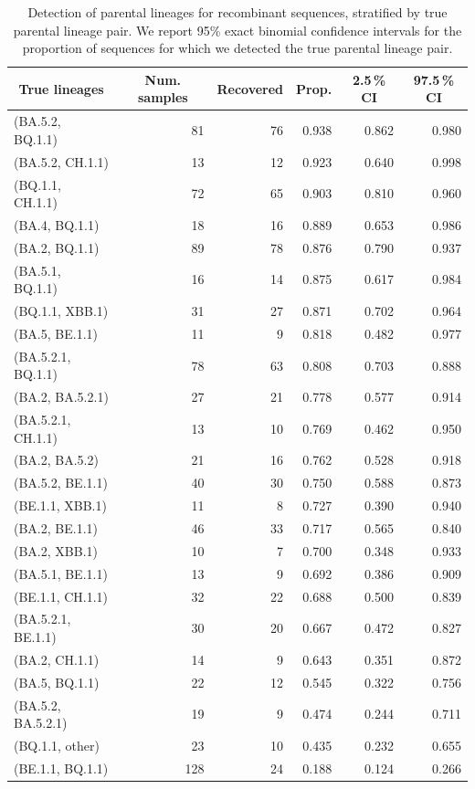 \documentclass[11pt,oneside,letterpaper]{article}
\begin{document}
\begin{table}[H]
\centering
\footnotesize
\begin{tabular}{@{}lrrrrr@{}}
\toprule
\multicolumn{1}{c}{True lineages} & \multicolumn{1}{c}{Num. samples} & \multicolumn{1}{c}{Recovered} & \multicolumn{1}{c}{Prop.} & \multicolumn{1}{c}{2.5\,\% CI} & \multicolumn{1}{c}{97.5\,\% CI} \\
\midrule
(BA.5.2, BQ.1.1) & 81 & 76 & 0.938 & 0.862 & 0.980 \\
(BA.5.2, CH.1.1) & 13 & 12 & 0.923 & 0.640 & 0.998 \\
(BQ.1.1, CH.1.1) & 72 & 65 & 0.903 & 0.810 & 0.960 \\
(BA.4, BQ.1.1) & 18 & 16 & 0.889 & 0.653 & 0.986 \\
(BA.2, BQ.1.1) & 89 & 78 & 0.876 & 0.790 & 0.937 \\
(BA.5.1, BQ.1.1) & 16 & 14 & 0.875 & 0.617 & 0.984 \\
(BQ.1.1, XBB.1) & 31 & 27 & 0.871 & 0.702 & 0.964 \\
(BA.5, BE.1.1) & 11 & 9 & 0.818 & 0.482 & 0.977 \\
(BA.5.2.1, BQ.1.1) & 78 & 63 & 0.808 & 0.703 & 0.888 \\
(BA.2, BA.5.2.1) & 27 & 21 & 0.778 & 0.577 & 0.914 \\
(BA.5.2.1, CH.1.1) & 13 & 10 & 0.769 & 0.462 & 0.950 \\
(BA.2, BA.5.2) & 21 & 16 & 0.762 & 0.528 & 0.918 \\
(BA.5.2, BE.1.1) & 40 & 30 & 0.750 & 0.588 & 0.873 \\
(BE.1.1, XBB.1) & 11 & 8 & 0.727 & 0.390 & 0.940 \\
(BA.2, BE.1.1) & 46 & 33 & 0.717 & 0.565 & 0.840 \\
(BA.2, XBB.1) & 10 & 7 & 0.700 & 0.348 & 0.933 \\
(BA.5.1, BE.1.1) & 13 & 9 & 0.692 & 0.386 & 0.909 \\
(BE.1.1, CH.1.1) & 32 & 22 & 0.688 & 0.500 & 0.839 \\
(BA.5.2.1, BE.1.1) & 30 & 20 & 0.667 & 0.472 & 0.827 \\
(BA.2, CH.1.1) & 14 & 9 & 0.643 & 0.351 & 0.872 \\
(BA.5, BQ.1.1) & 22 & 12 & 0.545 & 0.322 & 0.756 \\
(BA.5.2, BA.5.2.1) & 19 & 9 & 0.474 & 0.244 & 0.711 \\
(BQ.1.1, other) & 23 & 10 & 0.435 & 0.232 & 0.655 \\
(BE.1.1, BQ.1.1) & 128 & 24 & 0.188 & 0.124 & 0.266 \\
\bottomrule
\end{tabular}
\caption{Detection of parental lineages for recombinant sequences, stratified by true parental lineage pair. We report 95\% exact binomial confidence intervals for the proportion of sequences for which we detected the true parental lineage pair.}\label{tab:perfect_match_filtered}
\end{table}
\end{document}
